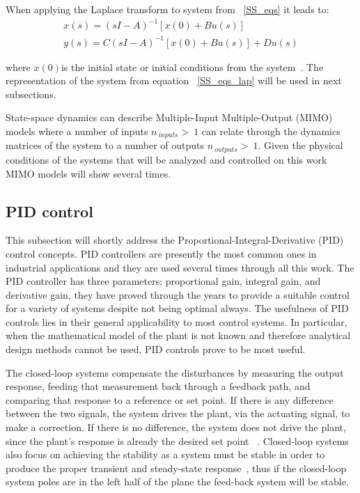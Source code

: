  When applying the Laplace transform to system from ~\ref{SS_eqs} it leads to:
 \begin{align}
 	x(s)=(sI-A)^{-1}[x(0)+Bu(s)]\\
 	y(s)=C(sI-A)^{-1}[x(0)+Bu(s)]+Du(s)
 	\label{SS_eqs_lap}
 \end{align}
 
 where $x(0) $is the initial state or initial conditions from the system~\cite[Chapter ~4]{Chen1999}. The representation of the system from equation ~\ref{SS_eqs_lap} will be used in next subsections.\smallskip
 
State-space dynamics can describe Multiple-Input Multiple-Output (MIMO) models where a number of inputs $n_{~inputs}>~1$ can relate through the dynamics  matrices of the system to a number of outputs $n_{~outputs}>~1$. Given the physical conditions of the systems that will be analyzed and controlled on this work MIMO models will show several times.


\subsection{PID control}
\label{PID_sec}
This subsection will shortly address the Proportional-Integral-Derivative (PID) control  concepts. PID controllers are presently the most common ones in industrial applications and they are used several times through all this work. The PID controller has three parameters; proportional gain, integral gain, and derivative gain, they have proved through the years to provide a suitable control for a variety of systems despite not being optimal always. The usefulness of PID controls lies in their general applicability to most control systems. In particular, when the mathematical model of the plant is not known and therefore analytical design methods cannot be used, PID controls prove to be most useful.  
\smallskip

The closed-loop systems compensate the disturbances by measuring the output
response, feeding that measurement back through a feedback path, and comparing
that response to a reference or set point. If there is any difference between
the two signals, the system drives the plant, via the actuating signal, to make a
correction. If there is no difference, the system does not drive the plant, since the
plant’s response is already the desired set point ~\cite[Chapter ~1]{Nise}. Closed-loop systems also focus on achieving the stability as a system must be stable in order to produce the proper transient and steady-state response~\cite[Chapter ~3]{Nise}, thus if the closed-loop system poles are in the left half of the plane the feed-back system will be stable.
\smallskip

